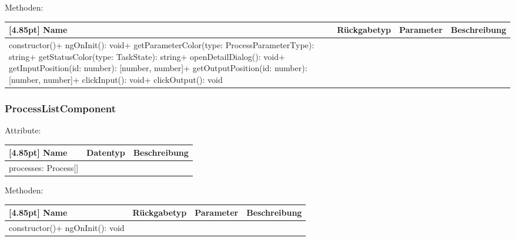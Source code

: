                 Methoden:
        		\begin{center}
                \setlength\tabcolsep{5pt}
                	\renewcommand{\arraystretch}{1.5}
                    	\begin{tabularx}{\textwidth}{|l|l|l|X|}
                    	\hline
                    	\rowcolor[gray]{0.75}[4.85pt]
                		Name & Rückgabetyp & Parameter & Beschreibung \\ \hline
                		constructor()+ ngOnInit(): void+ getParameterColor(type: ProcessParameterType): string+ getStatusColor(type: TaskState): string+ openDetailDialog(): void+ getInputPosition(id: number): [number, number]+ getOutputPosition(id: number): [number, number]+ clickInput(): void+ clickOutput(): void
                        & & &  \\ \hline
                        \end{tabularx}
        		\end{center}
        	
        	\subsubsection{ProcessListComponent}
        	
        	    Attribute:
                \begin{center}
                	\renewcommand{\arraystretch}{1.5}
                    \setlength\tabcolsep{5pt}
                	\begin{tabularx}{\textwidth}{|l|l|X|}
                		\hline
                        \rowcolor[gray]{0.75}[4.85pt]            		
                        Name & Datentyp & Beschreibung \\ \hline
                        processes: Process[]
                        & &  \\ \hline
                	\end{tabularx}
                \end{center}
                
                Methoden:
        		\begin{center}
                \setlength\tabcolsep{5pt}
                	\renewcommand{\arraystretch}{1.5}
                    	\begin{tabularx}{\textwidth}{|l|l|l|X|}
                    	\hline
                    	\rowcolor[gray]{0.75}[4.85pt]
                		Name & Rückgabetyp & Parameter & Beschreibung \\ \hline 
                		constructor()+ ngOnInit(): void
                        & & &  \\ \hline
                        \end{tabularx}
        		\end{center}
        	
